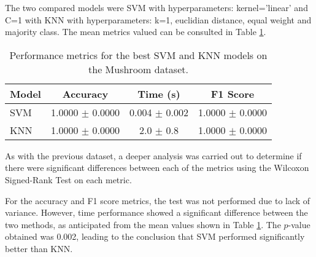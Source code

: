 The two compared models were SVM with hyperparameters: kernel='linear' and C=1 with KNN with hyperparameters: k=1, euclidian distance, equal weight and majority class. The mean metrics valued can be consulted in Table \ref{tab:svm-knn-mushroom}. \newline

\begin{table}[h!]
\centering
\begin{tabular}{|l|c|c|c|}
\hline
\textbf{Model} & \textbf{Accuracy} & \textbf{Time (s)} & \textbf{F1 Score} \\
\hline
SVM & 1.0000 $\pm$ 0.0000 & 0.004 $\pm$ 0.002 & 1.0000 $\pm$ 0.0000 \\
\hline
KNN & 1.0000 $\pm$ 0.0000 & 2.0 $\pm$ 0.8 & 1.0000 $\pm$ 0.0000 \\
\hline
\end{tabular}
\caption{Performance metrics for the best SVM and KNN models on the Mushroom dataset.}
\label{tab:svm-knn-mushroom}
\end{table}

As with the previous dataset, a deeper analysis was carried out to determine if there were significant differences between each of the metrics using the Wilcoxon Signed-Rank Test on each metric.

For the accuracy and F1 score metrics, the test was not performed due to lack of variance. However, time performance showed a significant difference between the two methods, as anticipated from the mean values shown in Table \ref{tab:svm-knn-mushroom}. The $p$-value obtained was 0.002, leading to the conclusion that SVM performed significantly better than KNN.
